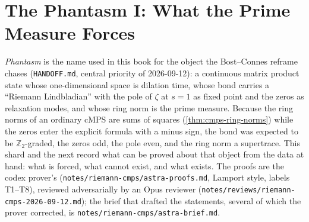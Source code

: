 
\section{The Phantasm I: What the Prime Measure Forces}
\label{sec:phantasm-forced}

\emph{Phantasm} is the name used in this book for the object the Bost--Connes reframe
chases (\texttt{HANDOFF.md}, central priority of 2026-09-12): a continuous matrix product
state whose one-dimensional space is dilation time, whose bond carries a ``Riemann
Lindbladian'' with the pole of $\zeta$ at $s=1$ as fixed point and the zeros as relaxation
modes, and whose ring norm is the prime measure. Because the ring norms of an ordinary
cMPS are sums of squares (\cref{thm:cmps-ring-norms}) while the zeros enter the explicit
formula with a minus sign, the bond was expected to be $\mathbb Z_2$-graded, the zeros odd,
the pole even, and the ring norm a supertrace. This shard and the next record what can
be proved about that object from the data at hand: what is forced, what cannot exist,
and what exists. The proofs are the codex prover's (\texttt{notes/riemann-cmps/astra-proofs.md},
Lamport style, labels T1--T8), reviewed adversarially by an Opus reviewer
(\texttt{notes/reviews/riemann-cmps-2026-09-12.md}); the brief that drafted the
statements, several of which the prover corrected, is
\texttt{notes/riemann-cmps/astra-brief.md}.


